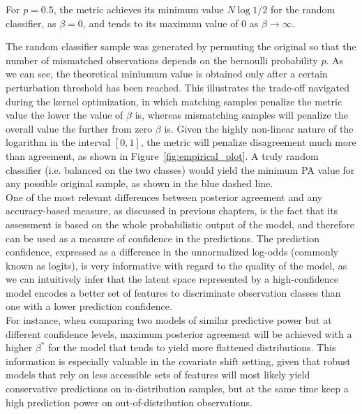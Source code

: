 For $p=0.5$, the metric achieves its minimum 
value $N \log{1/2}$ for the random classifier, as $\beta = 0$, and tends to its maximum
value of $0$ as $\beta \longrightarrow \infty$.



The random classifier sample was generated by permuting the original so 
that the number of mismatched observations depends on the bernoulli probability $p$. 
As we can see, the theoretical miniumum value  is obtained only after
a certain perturbation threshold has been reached. This illustrates the trade-off
navigated during the kernel optimization, in which matching samples penalize the 
metric value the lower the value of $\beta$ is, whereas mismatching samples will
penalize the overall value the further from zero $\beta$ is. Given the highly non-linear
nature of the logarithm in the interval $[0,1]$, the metric will penalize 
disagreement much more than agreement, as shown in Figure~\ref{fig:empirical_plot}.
A truly random classifier (i.e. balanced on the two classes) would yield the minimum
PA value for any possible original sample, as shown in the blue dashed line.\\

One of the most relevant differences between posterior agreement and any accuracy-based
measure, as discussed in previous chapters, is the fact that its assessment is based on
the whole probabilistic output of the model, and therefore can be used as a measure of
confidence in the predictions. The prediction confidence, expressed as a difference in 
the unnormalized log-odds (commonly known as logits), is very informative with regard 
to the quality of the model, as we can intuitively infer that the latent 
space represented by a high-confidence model encodes a better set of features 
to discriminate observation classes than one with a lower prediction confidence. \\

For instance, when comparing two models of similar predictive power but at different 
confidence levels, maximum posterior agreement will be achieved with a higher 
$\beta^{*}$ for the model that tends to yield more flattened distributions. This
information is especially valuable in the covariate shift setting, given that robust
models that rely on less accessible sets of features will most likely yield conservative
predictions on in-distribution samples, but at the same time keep a high prediction
power on out-of-distribution observations. \\

